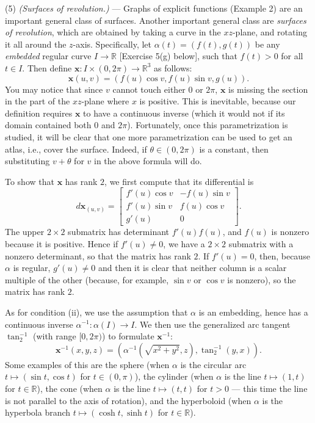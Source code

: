 \documentclass[leqno]{book}
\begin{document}
(5) \emph{(Surfaces of revolution.)} \---- Graphs of explicit functions (Example 2) are an important general class of surfaces.  Another important general class are \emph{surfaces of revolution}, which are obtained by taking a curve in the $xz$-plane, and rotating it all around the $z$-axis.  Specifically, let $\alpha(t)=(f(t),g(t))$ be any \emph{embedded} regular curve $I\to\mathbb R$ [Exercise 5(g) below], such that $f(t)>0$ for all $t\in I$.  Then define $\mathbf x:I\times(0,2\pi)\to\mathbb R^3$ as follows:
$$\mathbf x(u,v)=(f(u)\cos v,f(u)\sin v,g(u)).$$
You may notice that since $v$ cannot touch either $0$ or $2\pi$, $\mathbf x$ is missing the section in the part of the $xz$-plane where $x$ is positive.  This is inevitable, because our definition requires $\mathbf x$ to have a continuous inverse (which it would not if its domain contained both $0$ and $2\pi$).  Fortunately, once this parametrization is studied, it will be clear that one more parametrization can be used to get an atlas, i.e., cover the surface.  Indeed, if $\theta\in(0,2\pi)$ is a constant, then substituting $v+\theta$ for $v$ in the above formula will do.

To show that $\mathbf x$ has rank $2$, we first compute that its differential is
$$d\mathbf x_{(u,v)}=\begin{bmatrix}f'(u)\cos v&-f(u)\sin v\\f'(u)\sin v&f(u)\cos v\\g'(u)&0\end{bmatrix}.$$
The upper $2\times 2$ submatrix has determinant $f'(u)f(u)$, and $f(u)$ is nonzero because it is positive.  Hence if $f'(u)\ne 0$, we have a $2\times 2$ submatrix with a nonzero determinant, so that the matrix has rank $2$.  If $f'(u)=0$, then, because $\alpha$ is regular, $g'(u)\ne 0$ and then it is clear that neither column is a scalar multiple of the other (because, for example, $\sin v$ or $\cos v$ is nonzero), so the matrix has rank $2$.

As for condition (ii), we use the assumption that $\alpha$ is an embedding, hence has a continuous inverse $\alpha^{-1}:\alpha(I)\to I$.  We then use the generalized arc tangent $\tan^{-1}_2$ (with range $[0,2\pi)$) to formulate $\mathbf x^{-1}$:\\
$$\mathbf x^{-1}(x,y,z)=(\alpha^{-1}(\sqrt{x^2+y^2},z),\tan^{-1}_2(y,x)).$$
Some examples of this are the sphere (when $\alpha$ is the circular arc $t\mapsto(\sin t,\cos t)$ for $t\in(0,\pi)$), the cylinder (when $\alpha$ is the line $t\mapsto(1,t)$ for $t\in\mathbb R$), the cone (when $\alpha$ is the line $t\mapsto(t,t)$ for $t>0$ \---- this time the line is not parallel to the axis of rotation), and the hyperboloid (when $\alpha$ is the hyperbola branch $t\mapsto(\cosh t,\sinh t)$ for $t\in\mathbb R$).
\end{document}
